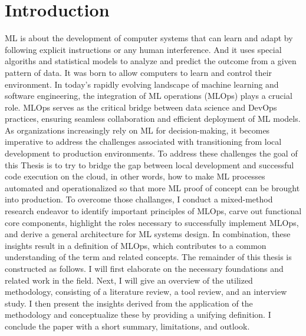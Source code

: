 \chapter{Introduction}\label{chapter:introduction}

\ac{ML} is about the development of computer systems that can learn and adapt by following explicit instructions or any human interference. And it uses special algoriths and statistical models to analyze and predict the outcome from a given pattern of data. It was born to allow computers to learn and control their environment.\newline
In today’s rapidly evolving landscape of machine learning and software engineering, the integration of \ac{ML} operations (\ac{MLOps}) plays a crucial role. \ac{MLOps} serves as the critical bridge between data science and DevOps practices, ensuring seamless collaboration and efficient deployment of \ac{ML} models. As organizations increasingly rely on \ac{ML} for decision-making, it becomes imperative to address the challenges associated with transitioning from local development to production environments.
\newline
To address these  challenges the goal of this Thesis is to try to bridge the gap between local development and successful code execution on the cloud, in other words, how to make \ac{ML} processes automated and operationalized so that more \ac{ML} proof of concept can be brought into production.
\newline
To overcome those challanges, I conduct a mixed-method research
endeavor to identify important principles of \ac{MLOps}, carve
out functional core components, highlight the roles necessary to
successfully implement \ac{MLOps}, and derive a general
architecture for \ac{ML} systems design. In combination, these insights
result in a definition of \ac{MLOps}, which contributes to a common
understanding of the term and related concepts. 
\newline
The remainder of this thesis is constructed as follows. I will first
elaborate on the necessary foundations and related work in the field.
Next, I will give an overview of the utilized methodology,
consisting of a literature review, a tool review, and an interview
study. I then present the insights derived from the application of
the methodology and conceptualize these by providing a unifying
definition. I conclude the paper with a short summary,
limitations, and outlook.
